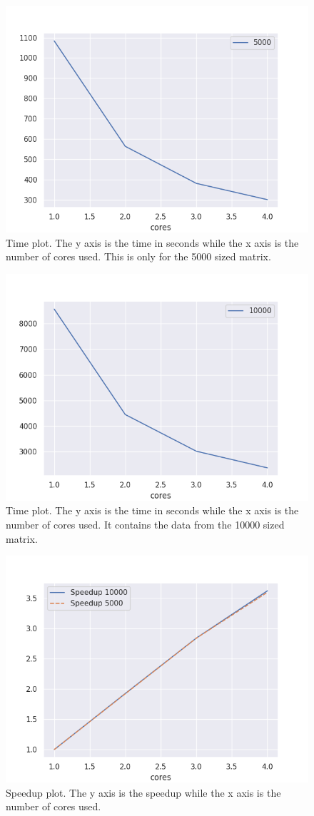 \documentclass[11pt, a4paper]{article}
\begin{document}
	
	\begin{figure}[H]
		\centering
		\includegraphics[width=0.7\linewidth]{plots/time-1}
		\caption[Time Plot]{Time plot. The y axis is the time in seconds while the x axis is the number of cores used. This is only for the 5000 sized matrix.}
		\label{fig:time-1}
	\end{figure}
	
\begin{figure}[H]
	\centering
	\includegraphics[width=0.7\linewidth]{plots/time-2}
	\caption[Time Plot]{Time plot. The y axis is the time in seconds while the x axis is the number of cores used. It contains the data from the 10000 sized matrix.}
	\label{fig:time-2}
\end{figure}
	
\begin{figure}[H]
	\centering
	\includegraphics[width=0.7\linewidth]{plots/speedup}
	\caption[Speedup plot]{Speedup plot. The y axis is the speedup while the x axis is the number of cores used.}
	\label{fig:speedup}
\end{figure}
	
\end{document}
